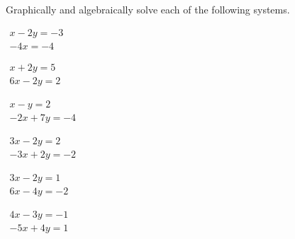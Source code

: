 






\sectionExercises


\begin{exercise}  
Graphically and algebraically solve each of the following systems.

\begin{Parts}
\item\(\begin{array}{l} x-2y=-3\\-4x=-4 \end{array}\)

\begin{OmitV1}
\item\(\begin{array}{l} x+2y=5\\ 6x -2y=2 \end{array}\)

\item\(\begin{array}{l} x-y=2\\ -2x +7y=-4 \end{array}\)
\end{OmitV1}

\item\(\begin{array}{l} 3x -2y=2\\ -3x +2y=-2 \end{array}\)

\item\(\begin{array}{l} 3x -2y=1\\ 6x -4y=-2 \end{array}\)

\item\(\begin{array}{l} 4x -3y=-1\\ -5x +4y=1 \end{array}\)


\end{Parts}
\end{exercise}

